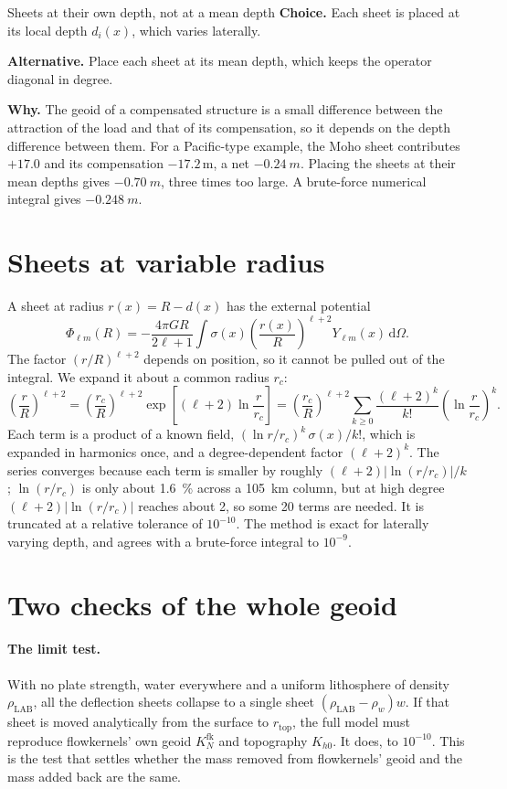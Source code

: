 \begin{decision}{Sheets at their own depth, not at a mean depth}
\textbf{Choice.} Each sheet is placed at its local depth $d_i(x)$, which varies laterally.

\textbf{Alternative.} Place each sheet at its mean depth, which keeps the operator diagonal in degree.

\textbf{Why.} The geoid of a compensated structure is a small difference between the attraction of the load and that of its compensation, so it depends on the depth difference between them.
For a Pacific-type example, the Moho sheet contributes $+17.0$ and its compensation $-17.2$\,m, a net $\qty{-0.24}{m}$.
Placing the sheets at their mean depths gives $\qty{-0.70}{m}$, three times too large.
A brute-force numerical integral gives $\qty{-0.248}{m}$.
\end{decision}

\section{Sheets at variable radius}

A sheet at radius $r(x) = R - d(x)$ has the external potential
\[
    \Phi_{\ell m}(R) = -\frac{4\pi G R}{2\ell+1}\int \sigma(x)\left(\frac{r(x)}{R}\right)^{\ell+2} Y_{\ell m}(x)\,\mathrm{d}\Omega .
\]
The factor $(r/R)^{\ell+2}$ depends on position, so it cannot be pulled out of the integral.
We expand it about a common radius $r_c$:
\[
    \left(\frac{r}{R}\right)^{\ell+2} = \left(\frac{r_c}{R}\right)^{\ell+2}\exp\!\left[(\ell+2)\ln\frac{r}{r_c}\right]
    = \left(\frac{r_c}{R}\right)^{\ell+2}\sum_{k\ge0}\frac{(\ell+2)^k}{k!}\left(\ln\frac{r}{r_c}\right)^k .
\]
Each term is a product of a known field, $(\ln r/r_c)^k\,\sigma(x)/k!$, which is expanded in harmonics once, and a degree-dependent factor $(\ell+2)^k$.
The series converges because each term is smaller by roughly $(\ell+2)|\ln(r/r_c)|/k$; $\ln(r/r_c)$ is only about \qty{1.6}{\percent} across a \qty{105}{km} column, but at high degree $(\ell+2)|\ln(r/r_c)|$ reaches about 2, so some 20 terms are needed. It is truncated at a relative tolerance of $10^{-10}$.
The method is exact for laterally varying depth, and agrees with a brute-force integral to $10^{-9}$.

\section{Two checks of the whole geoid}

\paragraph{The limit test.}
With no plate strength, water everywhere and a uniform lithosphere of density $\rho_{\mathrm{LAB}}$, all the deflection sheets collapse to a single sheet $(\rho_{\mathrm{LAB}}-\rho_w)w$.
If that sheet is moved analytically from the surface to $r_{\mathrm{top}}$, the full model must reproduce flowkernels' own geoid $K_N^{\mathrm{fk}}$ and topography $K_{h0}$.
It does, to $10^{-10}$.
This is the test that settles whether the mass removed from flowkernels' geoid and the mass added back are the same.


